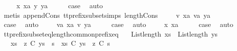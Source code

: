 \isamarkupfalse%
\isanewline
\ \ \isamarkupfalse%
\ {\isacharparenleft}{}\ x\ xa\ y\ ya{\isacharparenright}\isanewline
\ \ \isamarkupfalse%
\ \isamarkupfalse%
\ {\isacharquery}case\ \isamarkupfalse%
\ auto\isanewline
\ \ \ \ \isamarkupfalse%
\ {\isacharparenleft}metis\ append{\isacharunderscore}Cons\ tt{\isacharunderscore}prefix{\isacharunderscore}subset{\isachardot}simps{\isacharparenleft}{}{\isacharparenright}\ length{\isacharunderscore}Cons{\isacharparenright}\isanewline
{}\isamarkupfalse%
\isanewline
\ \ \isamarkupfalse%
\ {\isacharparenleft}{\isachardoublequoteopen}{}{\isacharunderscore}{}{\isachardoublequoteclose}\ v\ xa\ va\ ya{\isacharparenright}\isanewline
\ \ \isamarkupfalse%
\ \isamarkupfalse%
\ {\isacharquery}case\ \isamarkupfalse%
\ auto\isanewline
{}\isamarkupfalse%
\isanewline
\ \ \isamarkupfalse%
\ {\isacharparenleft}{\isachardoublequoteopen}{}{\isacharunderscore}{}{\isachardoublequoteclose}\ va\ xa\ v\ ya{\isacharparenright}\isanewline
\ \ \isamarkupfalse%
\ \isamarkupfalse%
\ {\isacharquery}case\ \isamarkupfalse%
\ auto\isanewline
{}\isamarkupfalse%
\isanewline
\ \ \isamarkupfalse%
\ {\isacharparenleft}{}\ x\ xa{\isacharparenright}\isanewline
\ \ \isamarkupfalse%
\ \isamarkupfalse%
\ {\isacharquery}case\ \isamarkupfalse%
\ auto\isanewline
{}\isamarkupfalse%
%
\endisatagproof
{\isafoldproof}%
%
\isadelimproof
\isanewline
%
\endisadelimproof
\isanewline
{}\isamarkupfalse%
\ tt{\isacharunderscore}prefix{\isacharunderscore}subset{\isacharunderscore}eq{\isacharunderscore}length{\isacharunderscore}common{\isacharunderscore}prefix{\isacharunderscore}eq{\isacharcolon}\isanewline
\ \ \ {\isachardoublequoteopen}List{\isachardot}length\ xs\ {\isacharequal}\ List{\isachardot}length\ ys{\isachardoublequoteclose}\isanewline
\ \ \ {\isachardoublequoteopen}{\isacharparenleft}{\isacharparenleft}xs\ {\isacharat}\ z{\isacharparenright}\ {\isasymlesssim}\isactrlsub C\ {\isacharparenleft}ys\ {\isacharat}\ s{\isacharparenright}{\isacharparenright}\ {\isacharequal}\ {\isacharparenleft}xs\ {\isasymlesssim}\isactrlsub C\ ys\ {\isasymand}\ z\ {\isasymlesssim}\isactrlsub C\ s{\isacharparenright}{\isachardoublequoteclose}\isanewline
